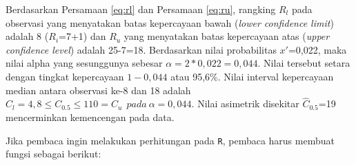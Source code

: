 \documentclass[]{book}
\newenvironment{Shaded}{\begin{snugshade}}{\end{snugshade}}
\newcommand{\KeywordTok}[1]{\textcolor[rgb]{0.13,0.29,0.53}{\textbf{#1}}}
\newcommand{\DataTypeTok}[1]{\textcolor[rgb]{0.13,0.29,0.53}{#1}}
\newcommand{\DecValTok}[1]{\textcolor[rgb]{0.00,0.00,0.81}{#1}}
\newcommand{\FloatTok}[1]{\textcolor[rgb]{0.00,0.00,0.81}{#1}}
\newcommand{\StringTok}[1]{\textcolor[rgb]{0.31,0.60,0.02}{#1}}
\newcommand{\CommentTok}[1]{\textcolor[rgb]{0.56,0.35,0.01}{\textit{#1}}}
\newcommand{\OtherTok}[1]{\textcolor[rgb]{0.56,0.35,0.01}{#1}}
\newcommand{\ControlFlowTok}[1]{\textcolor[rgb]{0.13,0.29,0.53}{\textbf{#1}}}
\newcommand{\OperatorTok}[1]{\textcolor[rgb]{0.81,0.36,0.00}{\textbf{#1}}}
\newcommand{\NormalTok}[1]{#1}
\begin{document}
Berdasarkan Persamaan \eqref{eq:rl} dan Persamaan \eqref{eq:ru}, rangking
\(R_l\) pada observasi yang menyatakan batas kepercayaan bawah
(\emph{lower confidence limit}) adalah 8 (\(R_i\)=7+1) dan \(R_u\) yang
menyatakan batas kepercayaan atas (\emph{upper confidence level}) adalah
25-7=18. Berdasarkan nilai probabilitas \(x'\)=0,022, maka nilai alpha
yang sesunggunya sebesar \(\alpha=2*0,022=0,044\). Nilai tersebut setara
dengan tingkat kepercayaan \(1-0,044\) atau 95,6\%. Nilai interval
kepercayaan median antara observasi ke-8 dan 18 adalah
\(C_l=4,8\le C_{0.5}\le110=C_u\ \ pada\ \alpha=0,044\). Nilai asimetrik
disekitar \(\hat{C}_{0.5}\)=19 mencerminkan kemencengan pada data.

Jika pembaca ingin melakukan perhitungan pada \texttt{R}, pembaca harus
membuat fungsi sebagai berikut:

\begin{Shaded}
\end{Shaded}
\end{document}
